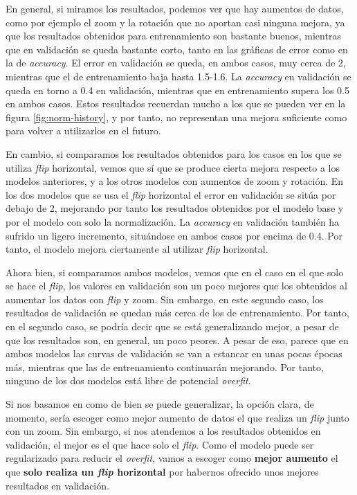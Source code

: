 \documentclass[11pt,a4paper]{article}
\begin{document}
En general, si miramos los resultados, podemos ver que hay aumentos de datos, como por ejemplo el zoom y la rotación
que no aportan casi ninguna mejora, ya que los resultados obtenidos para entrenamiento son bastante buenos, mientras
que en validación se queda bastante corto, tanto en las gráficas de error como en la de \textit{accuracy}. El error
en validación se queda, en ambos casos, muy cerca de 2, mientras que el de entrenamiento baja hasta 1.5-1.6. La
\textit{accuracy} en validación se queda en torno a 0.4 en validación, mientras que en entrenamiento supera los
0.5 en ambos casos. Estos resultados recuerdan mucho a los que se pueden ver en la figura \ref{fig:norm-history}, y por
tanto, no representan una mejora suficiente como para volver a utilizarlos en el futuro.

En cambio, si comparamos los resultados obtenidos para los casos en los que se utiliza \textit{flip} horizontal, vemos
que sí que se produce cierta mejora respecto a los modelos anteriores, y a los otros modelos con aumentos de zoom y rotación.
En los dos modelos que se usa el \textit{flip} horizontal el error en validación se sitúa por debajo de 2, mejorando por tanto 
los resultados obtenidos por el modelo base y por el modelo con solo la normalización. La \textit{accuracy} en validación
también ha sufrido un ligero incremento, situándose en ambos casos por encima de 0.4. Por tanto, el modelo mejora ciertamente
al utilizar \textit{flip} horizontal.

Ahora bien, si comparamos ambos modelos, vemos que en el caso en el que solo se hace el \textit{flip}, los valores en
validación son un poco mejores que los obtenidos al aumentar los datos con \textit{flip} y zoom. Sin embargo, en este
segundo caso, los resultados de validación se quedan más cerca de los de entrenamiento. Por tanto, en el segundo caso,
se podría decir que se está generalizando mejor, a pesar de que los resultados son, en general, un poco peores. A pesar
de eso, parece que en ambos modelos las curvas de validación se van a estancar en unas pocas épocas más, mientras
que las de entrenamiento continuarán mejorando. Por tanto, ninguno de los dos modelos está libre de potencial
\textit{overfit}.

Si nos basamos en como de bien se puede generalizar, la opción clara, de momento, sería escoger como mejor aumento
de datos el que realiza un \textit{flip} junto con un zoom. Sin embargo, si nos atendemos a los resultados obtenidos
en validación, el mejor es el que hace solo el \textit{flip}. Como el modelo puede ser regularizado para reducir
el \textit{overfit}, vamos a escoger como \textbf{mejor aumento} el que \textbf{solo realiza un \textit{flip} horizontal}
por habernos ofrecido unos mejores resultados en validación.
\end{document}
